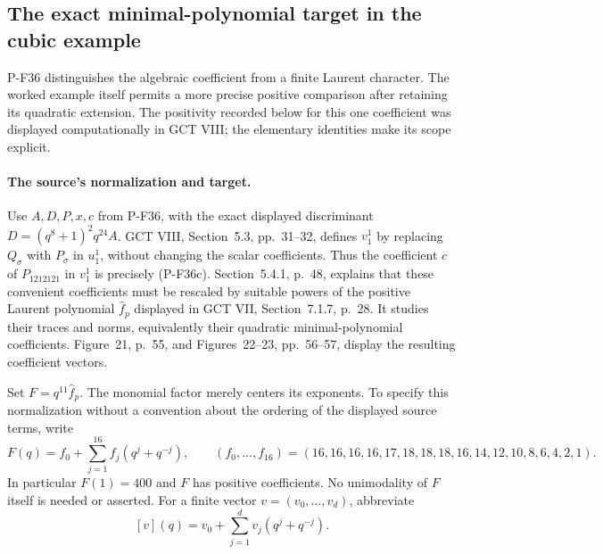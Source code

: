 \subsection{The exact minimal-polynomial target in the cubic example}

P-F36 distinguishes the algebraic coefficient from a finite Laurent
character. The worked example itself permits a more precise positive
comparison after retaining its quadratic extension. The positivity
recorded below for this one coefficient was displayed computationally
in GCT VIII; the elementary identities make its scope explicit.

\paragraph{The source's normalization and target.}
Use $A,D,P,x,c$ from P-F36, with the exact displayed discriminant
$D=(q^8+1)^2q^{24}A$. GCT VIII, Section~5.3, pp.~31--32,
defines $v_1^1$ by replacing $Q_\sigma$ with $P_\sigma$ in
$u_1^1$, without changing the scalar coefficients. Thus the coefficient
$c$ of $P_{1212121}$ in $v_1^1$ is precisely (P-F36c).
Section~5.4.1, p.~48, explains that these convenient coefficients must
be rescaled by suitable powers of the positive Laurent polynomial
$\widehat f_p$ displayed in GCT VII, Section~7.1.7, p.~28.
It studies their traces and norms, equivalently their quadratic
minimal-polynomial coefficients. Figure~21, p.~55, and
Figures~22--23, pp.~56--57, display the resulting coefficient vectors.

Set $F=q^{11}\widehat f_p$. The monomial factor merely centers its
exponents. To specify this normalization without a convention about
the ordering of the displayed source terms, write
\[
 F(q)=f_0+\sum_{j=1}^{16}f_j(q^j+q^{-j}),\qquad
 (f_0,\ldots,f_{16})=
 (16,16,16,16,17,18,18,18,16,14,12,10,8,6,4,2,1).
 \tag{P-F39a}
\]
In particular $F(1)=400$ and $F$ has positive coefficients.
No unimodality of $F$ itself is needed or asserted.
For a finite vector $v=(v_0,\ldots,v_d)$, abbreviate
\[
 [v](q)=v_0+\sum_{j=1}^d v_j(q^j+q^{-j}).
\]

